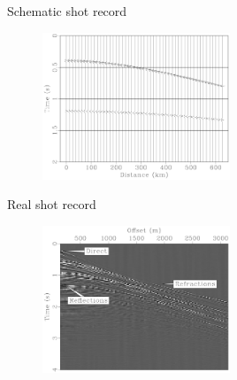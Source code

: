 \documentclass[xcolor=dvipsnames,notes]{beamer}
\begin{document}
%
\begin{frame}{Schematic shot record}
%
\begin{figure}
\includegraphics[width=0.5\textwidth]{Fig/schemshot.pdf}
\end{figure}
%
\end{frame}
\begin{frame}{Real shot record}
%
\begin{figure}
\includegraphics[width=0.5\textwidth]{Fig/shotgath.pdf}
\end{figure}
%
\end{frame}
\end{document}

